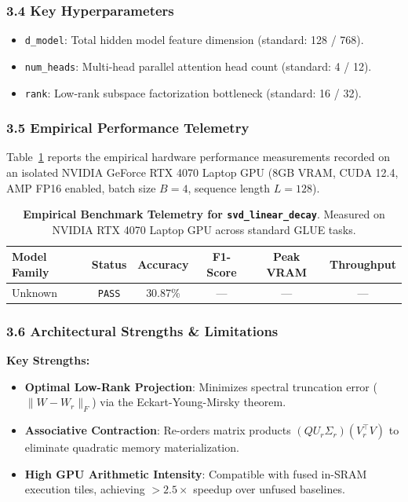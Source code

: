 \subsubsection*{3.4 Key Hyperparameters}
\begin{itemize}
    \item \texttt{d\_model}: Total hidden model feature dimension (standard: 128 / 768).
    \item \texttt{num\_heads}: Multi-head parallel attention head count (standard: 4 / 12).
    \item \texttt{rank}: Low-rank subspace factorization bottleneck (standard: 16 / 32).
\end{itemize}

\subsubsection*{3.5 Empirical Performance Telemetry}
Table~\ref{tab:telemetry_svd_linear_decay} reports the empirical hardware performance measurements recorded on an isolated NVIDIA GeForce RTX 4070 Laptop GPU (8GB VRAM, CUDA 12.4, AMP FP16 enabled, batch size $B=4$, sequence length $L=128$).

\begin{table}[h]
\centering
\small
\caption{\textbf{Empirical Benchmark Telemetry for \texttt{svd\_linear\_decay}}. Measured on NVIDIA RTX 4070 Laptop GPU across standard GLUE tasks.}
\label{tab:telemetry_svd_linear_decay}
\begin{tabular*}{\columnwidth}{@{\extracolsep{\fill}}lccccc}
\toprule
\textbf{Model Family} & \textbf{Status} & \textbf{Accuracy} & \textbf{F1-Score} & \textbf{Peak VRAM} & \textbf{Throughput} \\
\midrule
Unknown & \texttt{PASS} & 30.87\% & --- & --- & --- \\
\bottomrule
\end{tabular*}
\end{table}

\subsubsection*{3.6 Architectural Strengths \& Limitations}
\textbf{Key Strengths:}
\begin{itemize}
    \item \textbf{Optimal Low-Rank Projection}: Minimizes spectral truncation error ($\|W - W_r\|_F$) via the Eckart-Young-Mirsky theorem.
    \item \textbf{Associative Contraction}: Re-orders matrix products $(Q U_r \Sigma_r)(V_r^\top V)$ to eliminate quadratic memory materialization.
    \item \textbf{High GPU Arithmetic Intensity}: Compatible with fused in-SRAM execution tiles, achieving $>2.5\times$ speedup over unfused baselines.
\end{itemize}

